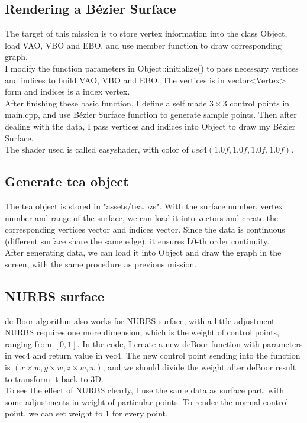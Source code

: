 \documentclass[acmtog]{acmart}
\begin{document}
\subsection{Rendering a Bézier Surface}
The target of this mission is to store vertex information into the class Object, load VAO, VBO and EBO, and use member function to draw corresponding graph.\\
I modify the function parameters in Object::initialize() to pass necessary vertices and indices to build VAO, VBO and EBO. The vertices is in vector<Vertex> form and indices is a index vertex.\\
After finishing these basic function, I define a self made $3\times3$ control points in main.cpp, and use Bézier Surface function to generate sample points. Then after dealing with the data, I pass vertices and indices into Object to draw my Bézier Surface.\\
The shader used is called easyshader, with color of $vec4(1.0f,1.0f,1.0f,1.0f)$.
\subsection{Generate tea object}
The tea object is stored in "assets/tea.bzs". With the surface number, vertex number and range of the surface, we can load it into vectors and create the corresponding vertices vector and indices vector. Since the data is continuous (different surface share the same edge), it ensures L0-th order continuity.\\
After generating data, we can load it into Object and draw the graph in the screen, with the same procedure as previous mission.
\subsection{NURBS surface}
de Boor algorithm also works for NURBS surface, with a little adjustment. NURBS requires one more dimension, which is the weight of control points, ranging from $[0,1]$. In the code, I create a new deBoor function with parameters in vec4 and return value in vec4. The new control point sending into the function is $(x\times w, y\times w, z\times w, w)$, and we should divide the weight after deBoor result to transform it back to 3D.\\
To see the effect of NURBS clearly, I use the same data as surface part, with some adjustments in weight of particular points.
To render the normal control point, we can set weight to $1$ for every point.
\end{document}
